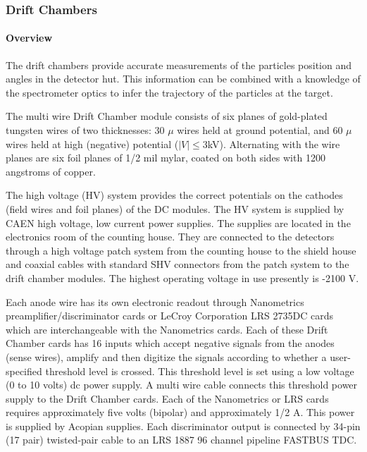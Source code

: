 \subsubsection{Drift Chambers}

\paragraph{Overview}

The drift chambers provide accurate measurements of the particles
position and angles in the detector hut. This information can be combined
with a knowledge of the spectrometer optics to infer the trajectory of the
particles at the target.

The multi wire Drift Chamber module consists of six planes of gold-plated
tungsten wires of two thicknesses: 30 $\mu$ wires held at ground
potential, and 60 $\mu$ wires held at high (negative) potential
($\left|V\right|\le3$kV).  Alternating with the wire planes are six
foil planes of 1/2 mil mylar, coated on both sides with 1200 angstroms
of copper.

The high voltage (HV) system provides the correct potentials on the
cathodes (field wires and foil planes) of the DC modules.  The HV
system is supplied by CAEN high voltage, low current power supplies.
The supplies are located in the electronics room of the counting
house. They are connected to the detectors through a high voltage patch
system from the counting house to the shield house
and coaxial cables with standard SHV connectors from the patch system
to the drift chamber modules.
The highest operating voltage in use presently is -2100 V.

Each anode wire has its own electronic readout through
Nanometrics preamplifier/discriminator
cards or LeCroy Corporation LRS 2735DC cards which are interchangeable
with the Nanometrics cards.  Each of these Drift Chamber cards has 16 inputs
which accept negative signals from the anodes (sense wires), amplify
and then digitize the signals according to whether a user-specified
threshold level is crossed.  This threshold level is set using a low
voltage (0 to 10 volts) dc power supply.  A
multi wire cable connects this threshold power supply to the Drift Chamber cards.
Each of the Nanometrics or LRS cards requires approximately five volts
(bipolar) and approximately 1/2 A.  This power is supplied by Acopian
supplies.  Each discriminator
output is connected by 34-pin (17 pair) twisted-pair cable to an LRS
1887 96 channel pipeline FASTBUS TDC.

